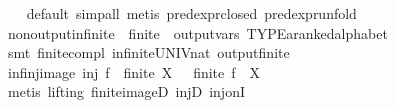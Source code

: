\begin{isabellebody}
%
\isadelimproof
\ \ %
\endisadelimproof
%
\isatagproof
{}\isamarkupfalse%
\ {}default{}\ simp{}all{}\ metis\ pred{}expr{}closed\ pred{}expr{}unfold{}%
\endisatagproof
{\isafoldproof}%
%
\isadelimproof
\isanewline
%
\endisadelimproof
\isanewline
{}\isamarkupfalse%
\ non{}output{}infinite{}\ {}{}\ finite\ {}{}\ output{}vars\ TYPE{}{}a{}{}ranked{}alphabet{}{}{}\isanewline
%
\isadelimproof
\ \ %
\endisadelimproof
%
\isatagproof
{}\isamarkupfalse%
\ {}smt\ finite{}compl\ infinite{}UNIV{}nat\ output{}finite{}%
\endisatagproof
{\isafoldproof}%
%
\isadelimproof
\isanewline
%
\endisadelimproof
\isanewline
{}\isamarkupfalse%
\ inf{}inj{}image{}\ {}{}inj\ f{}\ {}\ finite\ X{}\ {}\ {}\ finite\ {}f\ {}\ X{}{}\isanewline
%
\isadelimproof
\ \ %
\endisadelimproof
%
\isatagproof
{}\isamarkupfalse%
\ {}metis\ {}lifting{}\ finite{}imageD\ injD\ inj{}onI{}%

\end{isabellebody}
